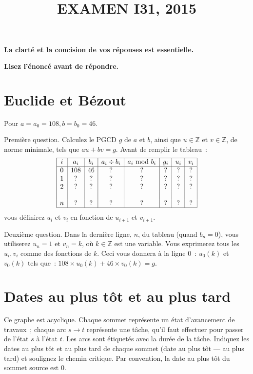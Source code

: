 \documentclass[11pt]{article}
\def\Z{\mathbb Z}
\begin{document}
\title{EXAMEN I31, 2015}
\date{}\maketitle

{\bf La clarté et la concision de vos réponses est essentielle.}

{\bf Lisez l'énoncé avant de répondre. }

{
\section{Euclide et Bézout}
Pour $a=a_0=108, b=b_0=46$. 

Première question. Calculez le PGCD $g$  de $a$ et $b$, ainsi que $u\in\Z$ et $v\in \Z$, de norme minimale,
tels que $au+bv=g$.
Avant de remplir le tableau~:
$$\begin{array}{|c|c|c|c|c|c|c|c|}
\hline
i & a_i & b_i & a_i\div b_i & a_i\mbox{ mod }b_i & g_i &u_i & v_i \\
\hline
0 & 108 & 46 & ? & ? & ? & ? & ? \\
1 & ? & ? & ? & ? & ? & ? & ?  \\
2 & ? & ? & ? & ? & ? & ? & ?  \\
 &  &  &  &  &  &  &   \\
n & ?  & ? & ? & ? & ? & ? & ?  \\
\hline
\end{array}
$$
vous  définirez $u_i$ et $v_i$ en fonction de $u_{i+1}$ et $v_{i+1}$.

Deuxième question. Dans la dernière ligne, $n$,  du tableau (quand 
$b_n =0$), vous utiliserez $u_n=1$ et $v_n=k$, où $k\in\Z$ est une variable. 
Vous exprimerez tous les $u_i, v_i$ comme des fonctions de $k$.
Ceci vous donnera à la  ligne 0~: $u_0(k)$ et $v_0(k)$
tels que~: $108\times  u_0(k) + 46 \times v_0(k) = g$. 
}

\section{Dates au plus tôt et au plus tard}

Ce graphe est acyclique. Chaque sommet représente un état d'avancement de travaux~; chaque arc $s\rightarrow t$ représente une tâche, qu'il faut effectuer pour passer de l'état $s$ à l'état $t$. Les arcs sont étiquetés avec la durée 
de la tâche. 
Indiquez les dates au plus tôt et au plus tard 
de  chaque sommet (date au plus tôt --- au plus tard)
et soulignez le chemin critique.  
Par convention, la date au plus tôt du sommet source est 0.
\end{document}
